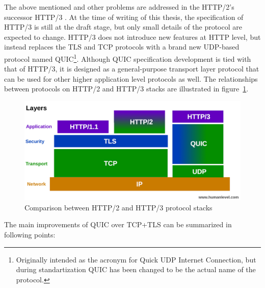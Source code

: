 The above mentioned and other problems  are addressed in the HTTP/2's successor HTTP/3  . At the time
of writing  of this thesis, the specification of HTTP/3 is still at the draft stage, but only small details of the
protocol are expected to change. HTTP/3 does not introduce new features at HTTP level, but instead
replaces the TLS and TCP protocols with a brand new UDP-based protocol named
QUIC\@\footnote{Originally intended as the acronym for Quick UDP Internet Connection, but during
standartization QUIC has been changed to be the actual name of the protocol.}. Although QUIC
specification development is tied with that of HTTP/3, it is designed as a general-purpose transport
layer protocol that can be used for other higher application level protocols as well. The
relationships between protocols on HTTP/2 and HTTP/3 stacks are illustrated in
figure~\ref{fig:http2-vs-http3-stack}. 

\begin{figure}[h]\label{fig:http2-vs-http3-stack}
  \centering
  \includegraphics[width=\textwidth]{img/01-pile-http-protocol}
  \caption{Comparison between HTTP/2 and HTTP/3 protocol stacks}
\end{figure}

The main improvements of QUIC over TCP+TLS can be summarized in following points:

